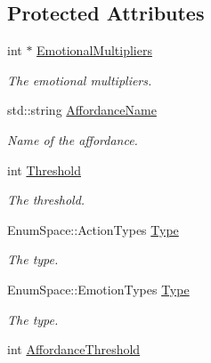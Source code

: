 \subsection*{Protected Attributes}
\begin{DoxyCompactItemize}
\item 
\hypertarget{classabstract_a7bdcfaa80c09f089dafce55647285214}{int $\ast$ \hyperlink{classabstract_a7bdcfaa80c09f089dafce55647285214}{Emotional\-Multipliers}}\label{classabstract_a7bdcfaa80c09f089dafce55647285214}

\begin{DoxyCompactList}\small\item\em The emotional multipliers. \end{DoxyCompactList}\item 
\hypertarget{classabstract_a693533359baf2fc861de948ba5091cdd}{std\-::string \hyperlink{classabstract_a693533359baf2fc861de948ba5091cdd}{Affordance\-Name}}\label{classabstract_a693533359baf2fc861de948ba5091cdd}

\begin{DoxyCompactList}\small\item\em Name of the affordance. \end{DoxyCompactList}\item 
\hypertarget{classabstract_a6c5131d8009cb69892a439a737e86217}{int \hyperlink{classabstract_a6c5131d8009cb69892a439a737e86217}{Threshold}}\label{classabstract_a6c5131d8009cb69892a439a737e86217}

\begin{DoxyCompactList}\small\item\em The threshold. \end{DoxyCompactList}\item 
\hypertarget{classabstract_a759e11dc626cafc1158be274981f54d5}{Enum\-Space\-::\-Action\-Types \hyperlink{classabstract_a759e11dc626cafc1158be274981f54d5}{Type}}\label{classabstract_a759e11dc626cafc1158be274981f54d5}

\begin{DoxyCompactList}\small\item\em The type. \end{DoxyCompactList}\item 
\hypertarget{classabstract_afb87fb1118b122841e9158b62247d84c}{Enum\-Space\-::\-Emotion\-Types \hyperlink{classabstract_afb87fb1118b122841e9158b62247d84c}{Type}}\label{classabstract_afb87fb1118b122841e9158b62247d84c}

\begin{DoxyCompactList}\small\item\em The type. \end{DoxyCompactList}\item 
\hypertarget{classabstract_abd1ac71987e1064ec409961e69680778}{int \hyperlink{classabstract_abd1ac71987e1064ec409961e69680778}{Affordance\-Threshold}}\label{classabstract_abd1ac71987e1064ec409961e69680778}


\end{DoxyCompactItemize}

